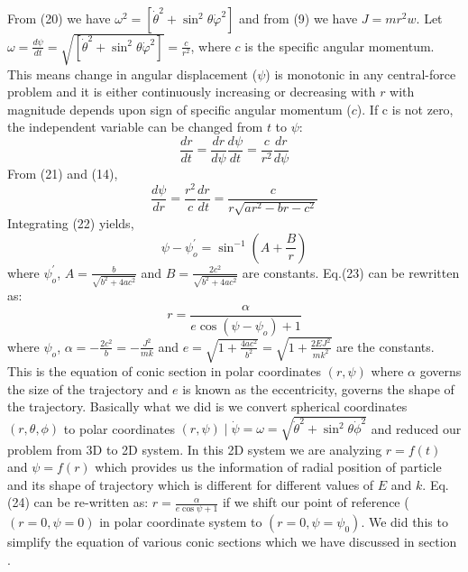 \documentclass[conference]{IEEEtran}
\newcommand{\RomanNumeralCaps}[1]{\MakeUppercase{\romannumeral #1}}
\begin{document}
From (20) we have $\omega^{2} = \left[\dot{\theta}^{2}+\sin ^{2} \theta \dot{\varphi}^{2}\right]$ and from (9) we have $J = mr^{2}w$. Let $\omega = \frac{d\psi}{dt} = \sqrt{\left[\dot{\theta}^{2}+\sin ^{2} \theta \dot{\varphi}^{2}\right]} = \frac{c}{r^{2}}$, where $c$ is the specific angular momentum. This means change in angular displacement ($\psi$) is monotonic in any central-force problem and it is either continuously increasing or decreasing with $r$ with magnitude depends upon sign of specific angular momentum ($c$). If c is not zero, the independent variable can be changed from $t$ to $\psi$: \begin{equation}
\frac{dr}{d t}=\frac{dr}{d \psi}\frac{d\psi}{d t} = \frac{c}{r^{2}}\frac{dr}{d \psi}
\end{equation} 
From (21) and (14), \begin{equation}
    \frac{d\psi}{d r} = \frac{r^{2}}{c}\frac{dr}{d t} = \frac{c}{r\sqrt{ar^{2} - br - c^{2}}}
\end{equation}
Integrating (22) yields, \begin{dmath}
    \psi - \psi_{o}^{'} = \sin^{-1}{\left(A + \frac{B}{r}\right)}
\end{dmath} where $\psi_{o}^{'}$, $A = \frac{b}{\sqrt{b^{2} + 4ac^{2}}}$ and $B = \frac{2c^{2}}{\sqrt{b^{2} + 4ac^{2}}}$ are constants. Eq.(23) can be rewritten as: \begin{dmath}r = \frac{\alpha}{e\cos \left(\psi - \psi_{o}\right) + 1}\end{dmath} where $\psi_{o}$, $\alpha = -\frac{2c^{2}}{b} = -\frac{J^{2}}{mk}$ and $e = \sqrt{1 + \frac{4ac^{2}}{b^{2}}} = \sqrt{1 + \frac{2EJ^{2}}{mk^{2}}}$ are the constants. This is the equation of conic section in polar coordinates $(r, \psi)$ where $\alpha$ governs the size of the trajectory and $e$ is known as the eccentricity, governs the shape of the trajectory. Basically what we did is we convert spherical coordinates $(r,\theta,\phi)$ to polar coordinates $(r,\psi) \mid \dot{\psi} = \omega = \sqrt{\dot{\theta}^{2} + \sin^2{\theta}\dot{\phi}^{2}}$ and reduced our problem from 3D to 2D system. In this 2D system we are analyzing $r = f(t)$ and $\psi = f(r)$ which provides us the information of radial position of particle and its shape of trajectory which is different for different values of $E$ and $k$. Eq. (24) can be re-written as: $r = \frac{\alpha}{e\cos{\psi}+1}$ if we shift our point of reference ($(r = 0,\psi = 0)$ in polar coordinate system  to $(r = 0,\psi = \psi_{0})$. We did this to simplify the equation of various conic sections which we have discussed in section \RomanNumeralCaps{6}.
\vspace{1em}
\end{document}
